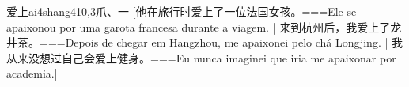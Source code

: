 \begin{EntryWithPhonetic}{爱上}{ai4shang4}{10,3}{⽖、⼀}
  [他在旅行时爱上了一位法国女孩。===Ele se apaixonou por uma garota francesa durante a viagem.  | 来到杭州后，我爱上了龙井茶。===Depois de chegar em Hangzhou, me apaixonei pelo chá Longjing. | 我从来没想过自己会爱上健身。===Eu nunca imaginei que iria me apaixonar por academia.]
\end{EntryWithPhonetic}

